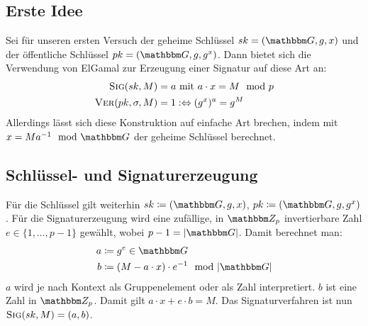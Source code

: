 \subsection{Erste Idee} 
Sei für unseren ersten Versuch der geheime
Schlüssel $\skey = (\G, g, x)$ und der öffentliche Schlüssel $\pkey =
(\G, g, g^x)$. Dann bietet sich die Verwendung von ElGamal zur Erzeugung
einer Signatur auf diese Art an:
\begin{align*} 
  \textsc{Sig}(sk,M) &= a \text{ mit } a \cdot x = M \mod p \\  
  \textsc{Ver}(pk,\sigma,M) &= 1 :\Leftrightarrow (g^x)^a =  g^M
\end{align*} 
Allerdings lässt sich diese Konstruktion auf einfache Art
brechen, indem mit $x = M a^{-1} \mod \G$ der geheime Schlüssel
berechnet.
\subsection{Schlüssel- und Signaturerzeugung} 
Für die Schlüssel gilt weiterhin $\skey \coloneqq (\G, g, x)$, $\pkey \coloneqq (\G, g,
g^x)$.  Für die Signaturerzeugung wird eine zufällige, in $\Z{p}$
invertierbare Zahl $e \in \{1, \dots, p - 1\}$ gewählt, wobei
$p-1=|\G|$. Damit berechnet man:
\begin{align*} 
  a &\coloneqq g^e \in \G\\ 
  b &\coloneqq (M - a \cdot x) \cdot e^{-1} \mod |\G|
\end{align*} 
$a$ wird je nach Kontext als Gruppenelement oder als Zahl interpretiert.
$b$ ist eine Zahl in $\Z{p}$.  Damit gilt $a \cdot x + e \cdot b =
M$. Das Signaturverfahren ist nun $\textsc{Sig}(sk,M) = (a, b)$.

